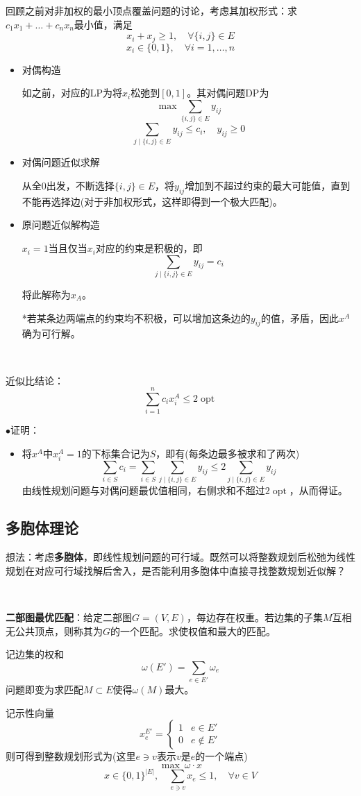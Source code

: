 \documentclass[a4paper,UTF8,fontset=windows]{ctexart}
\newcommand{\proo}[1]{{\kaishu $\bullet$证明：
\begin{itemize}
    \item[] #1
\end{itemize}
}}
\DeclareMathOperator*{\opt}{opt}
\begin{document}
回顾之前对非加权的最小顶点覆盖问题的讨论，考虑其加权形式：求$c_1x_1+\dots+c_nx_n$最小值，满足
$$x_i+x_j\ge1,\quad\forall\{i,j\}\in E$$
$$x_i\in\{0,1\},\quad\forall i=1,\dots,n$$
\begin{itemize}
    \item 对偶构造
    
    如之前，对应的LP为将$x_i$松弛到$[0,1]$。其对偶问题DP为
    $$\max\sum_{\{i,j\}\in E}y_{ij}$$
    $$\sum_{j\mid\{i,j\}\in E}y_{ij}\le c_i,\quad y_{ij}\ge0$$

    \item 对偶问题近似求解
    
    从全0出发，不断选择$\{i,j\}\in E$，将$y_{ij}$增加到不超过约束的最大可能值，直到不能再选择边(对于非加权形式，这样即得到一个极大匹配)。

    \item 原问题近似解构造
    
    $x_i=1$当且仅当$x_i$对应的约束是积极的，即
    $$\sum_{j\mid\{i,j\}\in E}y_{ij}=c_i$$

    将此解称为$x_A$。

    *若某条边两端点的约束均不积极，可以增加这条边的$y_{ij}$的值，矛盾，因此$x^A$确为可行解。
\end{itemize}

\

近似比结论：
$$\sum_{i=1}^nc_ix_i^A\le2\opt$$
\proo{
    将$x^A$中$x_i^A=1$的下标集合记为$S$，即有(每条边最多被求和了两次)
    $$\sum_{i\in S}c_i=\sum_{i\in S}\sum_{j\mid\{i,j\}\in E}y_{ij}\le2\sum_{j\mid\{i,j\}\in E}y_{ij}$$
    由线性规划问题与对偶问题最优值相同，右侧求和不超过$2\opt$，从而得证。
}

\subsection{多胞体理论}
想法：考虑\textbf{多胞体}，即线性规划问题的可行域。既然可以将整数规划后松弛为线性规划在对应可行域找解后舍入，是否能利用多胞体中直接寻找整数规划近似解？

\

\textbf{二部图最优匹配}：给定二部图$G=(V,E)$，每边存在权重。若边集的子集$M$互相无公共顶点，则称其为$G$的一个匹配。求使权值和最大的匹配。

记边集的权和
$$\omega(E')=\sum_{e\in E'}\omega_e$$
问题即变为求匹配$M\subset E$使得$\omega(M)$最大。

记示性向量
$$x_e^{E'}=\begin{cases}1&e\in E'\\0&e\notin E'\end{cases}$$
则可得到整数规划形式为(这里$e\ni v$表示$v$是$e$的一个端点)
$$\max\ \omega\cdot x$$
$$x\in\{0,1\}^{|E|},\quad\sum_{e\ni v}x_e\le1,\quad\forall v\in V$$
\end{document}
